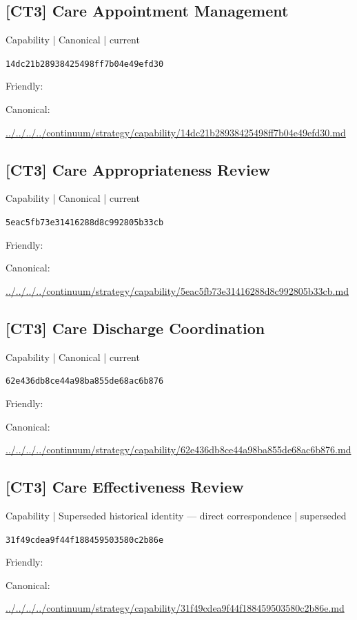\documentclass[10pt,a4paper]{article}
\begin{document}
\subsection*{[CT3] Care Appointment Management}
{\small Capability | Canonical | current}\par
\texttt{14dc21b28938425498ff7b04e49efd30}\par
Friendly: \par
Canonical: \par
{\footnotesize\url{../../../../continuum/strategy/capability/14dc21b28938425498ff7b04e49efd30.md}}\par
\subsection*{[CT3] Care Appropriateness Review}
{\small Capability | Canonical | current}\par
\texttt{5eac5fb73e31416288d8c992805b33cb}\par
Friendly: \par
Canonical: \par
{\footnotesize\url{../../../../continuum/strategy/capability/5eac5fb73e31416288d8c992805b33cb.md}}\par
\subsection*{[CT3] Care Discharge Coordination}
{\small Capability | Canonical | current}\par
\texttt{62e436db8ce44a98ba855de68ac6b876}\par
Friendly: \par
Canonical: \par
{\footnotesize\url{../../../../continuum/strategy/capability/62e436db8ce44a98ba855de68ac6b876.md}}\par
\subsection*{[CT3] Care Effectiveness Review}
{\small Capability | Superseded historical identity — direct correspondence | superseded}\par
\texttt{31f49cdea9f44f188459503580c2b86e}\par
Friendly: \par
Canonical: \par
{\footnotesize\url{../../../../continuum/strategy/capability/31f49cdea9f44f188459503580c2b86e.md}}\par
\end{document}
